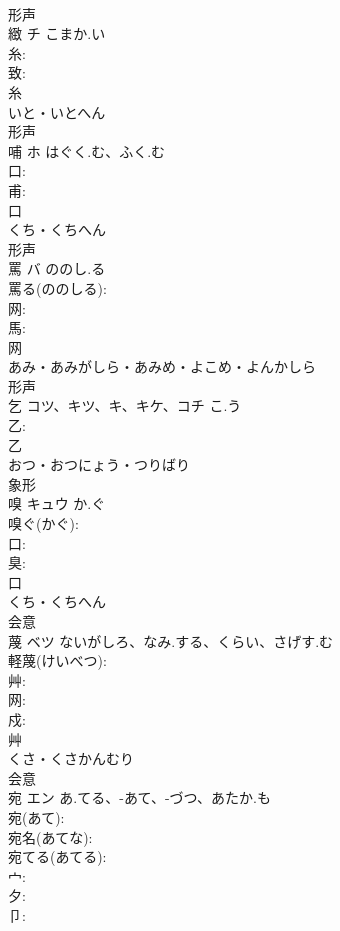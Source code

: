 \documentclass[8pt]{extreport}
\begin{document}
\begin{CJK}{UTF8}{min}
\\	形声 
\\	緻	チ	こまか.い		
\\	糸: 
\\	致: 
\\	糸	
\\	いと・いとへん	
\\	形声 
\\	哺	ホ	はぐく.む、ふく.む		
\\	口: 
\\	甫: 
\\	口	
\\	くち・くちへん	
\\	形声 
\\	罵	バ	ののし.る		
\\	罵る(ののしる): 
\\	网: 
\\	馬: 
\\	网	
\\	あみ・あみがしら・あみめ・よこめ・よんかしら	
\\	形声 
\\	乞	コツ、キツ、キ、キケ、コチ	こ.う		
\\	乙: 
\\	乙	
\\	おつ・おつにょう・つりばり	
\\	象形 
\\	嗅	キュウ	か.ぐ		
\\	嗅ぐ(かぐ): 
\\	口: 
\\	臭: 
\\	口	
\\	くち・くちへん	
\\	会意 
\\	蔑	ベツ	ないがしろ、なみ.する、くらい、さげす.む		
\\	軽蔑(けいべつ): 
\\	艸: 
\\	网: 
\\	戍: 
\\	艸	
\\	くさ・くさかんむり	
\\	会意 
\\	宛	エン	あ.てる、-あて、-づつ、あたか.も		
\\	宛(あて): 
\\	宛名(あてな): 
\\	宛てる(あてる): 
\\	宀: 
\\	夕: 
\\	卩: 

\end{CJK}
\end{document}
